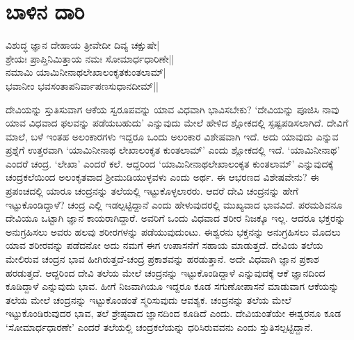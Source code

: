 {\newcommand\toptitle{}
\makeatletter
\patchcmd{\@makechapterhead}{\if@mainmatter}{\if@mainmatter\Large\bf\toptitle\vskip 20pt\par}{}{}
\makeatother

\renewcommand\toptitle{ಶ್ರೀ ಶ್ರೀ ಜಗದ್ಗುರು ಮಹಾಸ್ವಾಮಿಗಳವರ ಉಪದೇಶ}



\chapter{ಬಾಳಿನ ದಾರಿ}\label{chap1}}


\begin{shloka}
ವಿಶುದ್ಧ ಜ್ಞಾನ ದೇಹಾಯ ತ್ರೀವೇದೀ ದಿವ್ಯ ಚಕ್ಷುಷೇ|\\
ಶ್ರೇಯಃ ಪ್ರಾಪ್ತಿನಿಮಿತ್ತಾಯ ನಮಃ ಸೋಮಾರ್ಧಧಾರಿಣೇ||\\
ನಮಾಮಿ ಯಾಮಿನೀನಾಥಲೇಖಾಲಂಕೃತಕುಂತಲಾಮ್|\\
ಭವಾನೀಂ ಭವಸಂತಾಪನಿರ್ವಾಪಣಸುಧಾನದೀಮ್||
\end{shloka}


ದೇವಿಯನ್ನು ಸ್ತುತಿಸುವಾಗ ಆಕೆಯ ಸ್ವರೂಪವನ್ನು ಯಾವ ವಿಧವಾಗಿ ಭಾವಿಸಬೇಕು? `ದೇವಿಯನ್ನು ಪೂಜಿಸಿ ನಾವು ಯಾವ 
ವಿಧವಾದ ಫಲವನ್ನು ಪಡೆಯಬಹುದು' ಎನ್ನುವುದು ಮೇಲೆ ಹೇಳಿದ ಶ್ಲೋಕದಲ್ಲಿ ಸ್ಪಷ್ಟಪಡಿಸಲಾಗಿದೆ. ದೇವಿಗೆ 
ಮಾಲೆ, ಬಳೆ ಇಂತಹ ಅಲಂಕಾರಗಳು ಇದ್ದರೂ ಒಂದು ಅಲಂಕಾರ ವಿಶೇಷವಾಗಿ ಇದೆ. ಅದು ಯಾವುದು ಎನ್ನುವ ಪ್ರಶ್ನೆಗೆ 
ಉತ್ತರವಾಗಿ `ಯಾಮಿನೀನಾಥ ಲೇಖಾಲಂಕೃತ ಕುಂತಲಾಮ್' ಎಂದು ಶ್ಲೋಕದಲ್ಲಿ ಇದೆ. `ಯಾಮಿನೀನಾಥ' 
ಎಂದರೆ ಚಂದ್ರ. `ಲೇಖಾ' ಎಂದರೆ ಕಲೆ. ಆದ್ದರಿಂದ `ಯಾಮಿನೀನಾಥಲೇಖಾಲಂಕೃತ ಕುಂತಲಾಮ್' ಎನ್ನುವುದಕ್ಕೆ 
ಚಂದ್ರಕಲೆಯಿಂದ ಅಲಂಕೃತವಾದ ಶ್ರೀಮುಡಿಯುಳ್ಳವಳು ಎಂದು ಅರ್ಥ. ಈ ಆಭರಣದ ವಿಶೇಷವೇನು? ಈ 
ಪ್ರಪಂಚದಲ್ಲಿ ಯಾರೂ ಚಂದ್ರನನ್ನು ತಲೆಯಲ್ಲಿ ಇಟ್ಟುಕೊಳ್ಳಲಾರರು. ಆದರೆ ದೇವಿ ಚಂದ್ರನನ್ನು ಹೇಗೆ ಇಟ್ಟುಕೊಂಡಿದ್ದಾಳೆ? ಚಂದ್ರ 
ಎಲ್ಲಿ ಇಡಲ್ಪಟ್ಟಿದ್ದಾನೆ ಎಂದು ಹೇಳುವುದರಲ್ಲಿ ಮುಖ್ಯವಾದ ಭಾವವಿದೆ. ಪರಮಶಿವನೂ ದೇವಿಯೂ ಒಟ್ಟಾಗಿ 
ಜ್ಞಾನ ಕಾಯರಾಗಿದ್ದಾರೆ. ಅವರಿಗೆ ಒಂದು ವಿಧವಾದ ಶರೀರ ನಿಜಕ್ಕೂ ಇಲ್ಲ. ಆದರೂ ಭಕ್ತರನ್ನು ಅನುಗ್ರಹಿಸಲು 
ಅವರು ಹಲವು ಶರೀರಗಳನ್ನು ಪಡೆಯುವುದುಂಟು. ಈಶ್ವರನು ಭಕ್ತನನ್ನು ಅನುಗ್ರಹಿಸಲು ಮೊದಲು ಯಾವ ಶರೀರವನ್ನು 
ಪಡೆದನೋ ಅದು ನಮಗೆ ಈಗ ಉಪಾಸನೆಗೆ ಸಹಾಯ ಮಾಡುತ್ತದೆ. ದೇವಿಯ ತಲೆಯ ಮೇಲಿರುವ ಚಂದ್ರನ 
ಭಾವ ಹೀಗಿರುತ್ತದೆ-ಚಂದ್ರ ಪ್ರಕಾಶವನ್ನು ಹರಡುತ್ತಾನೆ. ಅದೇ ವಿಧವಾಗಿ ಜ್ಞಾನ ಪ್ರಕಾಶ ಹರಡುತ್ತದೆ. ಆದ್ದರಿಂದ ದೇವಿ 
ತಲೆಯ ಮೇಲೆ ಚಂದ್ರನನ್ನು ಇಟ್ಟುಕೊಂಡಿದ್ದಾಳೆ ಎನ್ನುವುದಕ್ಕೆ ಆಕೆ ಜ್ಞಾನದಿಂದ ಕೂಡಿದ್ದಾಳೆ ಎನ್ನುವುದು ಭಾವ. ಹೀಗೆ 
ನಿಜವಾಗಿಯೂ ಇದ್ದರೂ ಕೂಡ ಸಗುಣೋಪಾಸನೆ ಮಾಡುವಾಗ ಆಕೆಯನ್ನು ತಲೆಯ ಮೇಲೆ ಚಂದ್ರನನ್ನು ಇಟ್ಟುಕೊಂಡಂತೆ 
ಸ್ಮರಿಸುವುದು ಆವಶ್ಯಕ. ಚಂದ್ರನನ್ನು ತಲೆಯ ಮೇಲೆ ಇಟ್ಟುಕೊಂಡಿರುವುದರ ಭಾವ, ತಲೆ ಶ್ರೇಷ್ಠವಾದ ಜ್ಞಾನದಿಂದ 
ಕೂಡಿದೆ ಎಂದು. ದೇವಿಯಂತೆಯೇ ಈಶ್ವರನೂ ಕೂಡ `ಸೋಮಾರ್ಧಧಾರಣೇ' ಎಂದರೆ ತಲೆಯಲ್ಲಿ ಚಂದ್ರಕಲೆಯನ್ನು ಧರಿಸಿರುವವನು ಎಂದು ಸ್ತುತಿಸಲ್ಪಟ್ಟಿದ್ದಾನೆ.

